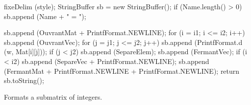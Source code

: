 \begin{code}
\begin{hide}
{      fixeDelim (style);
      StringBuffer sb = new StringBuffer();
      if (Name.length() > 0)
         sb.append (Name + " = ");

      sb.append (OuvrantMat + PrintfFormat.NEWLINE);
      for (i = i1; i <= i2; i++) {
         sb.append (OuvrantVec);
         for (j = j1; j <= j2; j++) {
            sb.append (PrintfFormat.d (w, Mat[i][j]));
            if (j < j2)
               sb.append (SepareElem);
         }
         sb.append (FermantVec);
         if (i < i2)
            sb.append (SepareVec + PrintfFormat.NEWLINE);
      }
      sb.append (FermantMat + PrintfFormat.NEWLINE + PrintfFormat.NEWLINE);
      return sb.toString();
   }\end{hide}
\end{code}
\begin{tabb} Formats a submatrix of integers.
\end{tabb}
\begin{htmlonly}
\end{htmlonly}
